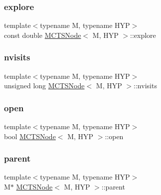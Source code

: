 \subsubsection{\texorpdfstring{explore}{explore}}
{\footnotesize\ttfamily template$<$typename M, typename H\+YP$>$ \\
const double \hyperlink{class_m_c_t_s_node}{M\+C\+T\+S\+Node}$<$ M, H\+YP $>$\+::explore}

\mbox{\label{class_m_c_t_s_node_a277d083d477ab4aaeeadfadada1cdc24}} 
\subsubsection{\texorpdfstring{nvisits}{nvisits}}
{\footnotesize\ttfamily template$<$typename M, typename H\+YP$>$ \\
unsigned long \hyperlink{class_m_c_t_s_node}{M\+C\+T\+S\+Node}$<$ M, H\+YP $>$\+::nvisits}

\mbox{\label{class_m_c_t_s_node_aa4d0f6bb2603cfe995aaafc5d208ec16}} 
\subsubsection{\texorpdfstring{open}{open}}
{\footnotesize\ttfamily template$<$typename M, typename H\+YP$>$ \\
bool \hyperlink{class_m_c_t_s_node}{M\+C\+T\+S\+Node}$<$ M, H\+YP $>$\+::open}

\mbox{\label{class_m_c_t_s_node_ab451a032b940daa976b7a5773d3246ca}} 
\subsubsection{\texorpdfstring{parent}{parent}}
{\footnotesize\ttfamily template$<$typename M, typename H\+YP$>$ \\
M$\ast$ \hyperlink{class_m_c_t_s_node}{M\+C\+T\+S\+Node}$<$ M, H\+YP $>$\+::parent}

\mbox{\label{class_m_c_t_s_node_a68b6340a1b917cda22d8976c9fc4efbe}} 
